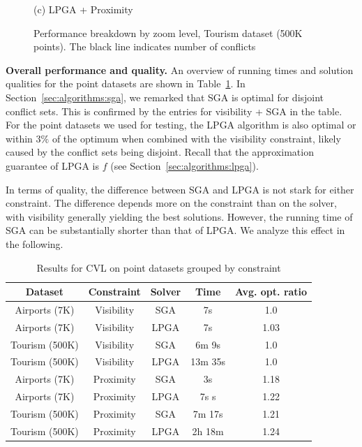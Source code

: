 \documentclass[11pt, oneside]{report}
\newcommand{\minisec}[1]{\noindent\textbf{#1.}}
\begin{document}
\begin{figure}[tb]
\begin{minipage}{0.329\linewidth}
    \centerline{(c) LPGA + Proximity}
  \end{minipage}
  \caption{Performance breakdown by zoom level, Tourism dataset (500K points). The black line indicates number of conflicts} \label{fig:performance:tourism}
\vspace{-1ex}
\end{figure}

\minisec{Overall performance and quality}
An overview of running times and solution qualities for the point datasets are shown in Table~\ref{tab:points:overview}. In Section~\ref{sec:algorithms:sga}, we remarked that SGA is optimal for disjoint conflict sets. This is confirmed by the entries for visibility + SGA in the table. For the point datasets we used for testing, the LPGA algorithm is also optimal or within $3\%$ of the optimum when combined with the visibility constraint, likely caused by the conflict sets being disjoint. Recall that the approximation guarantee of LPGA is $f$ (see Section~\ref{sec:algorithms:lpga}).

In terms of quality, the difference between SGA and LPGA is not stark for either constraint. The difference depends more on the constraint than on the solver, with visibility generally yielding the best solutions. However, the running time of SGA can be substantially shorter than that of LPGA. We analyze this effect in the following.

\begin{table}[htdp]
\caption{Results for CVL on point datasets grouped by constraint}
\begin{center}
\begin{tabular}{|c|c|c|c|c|}
\hline
\textbf{Dataset} & \textbf{Constraint} & \textbf{Solver} & \textbf{Time} & \textbf{Avg. opt. ratio}\\ 
\hline
Airports (7K) & Visibility & SGA & 7s & 1.0 \\
Airports (7K) & Visibility & LPGA & 7s & 1.03 \\
Tourism (500K) & Visibility & SGA & 6m 9s & 1.0 \\
Tourism (500K) & Visibility & LPGA & 13m 35s & 1.0 \\
\hline
Airports (7K)  & Proximity  & SGA & 3s & 1.18 \\
Airports (7K)  & Proximity & LPGA & 7s s & 1.22 \\
Tourism (500K) & Proximity & SGA & 7m 17s & 1.21 \\
Tourism (500K) & Proximity & LPGA & 2h 18m & 1.24 \\
\hline
\end{tabular}
\end{center}
\label{tab:points:overview}
\end{table}%
\end{document}
